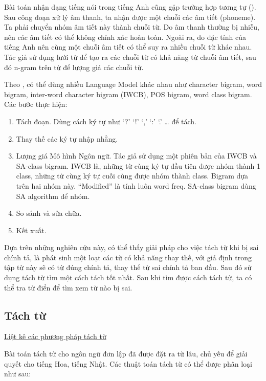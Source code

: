 \documentclass[a4paper,oneside]{book} %
\newcommand{\note}[1]{\underline{#1}}
\begin{document}
Bài toán nhận dạng tiếng nói trong tiếng Anh cũng gặp trường hợp tương tự
(\cite{Ravishankar}). Sau công đoạn xử lý âm thanh, ta nhận được
một chuỗi các âm tiết (phoneme). Ta phải chuyển nhóm âm tiết này thành
chuỗi từ. Do âm thanh thường bị nhiễu, nên các âm tiết có thể
không chính xác hoàn toàn. Ngoài ra, do đặc tính của tiếng Anh nên
cùng một chuỗi âm tiết có thể suy ra nhiều chuỗi từ khác nhau. Tác giả
sử dụng lưới từ để tạo ra các chuỗi từ có khả năng từ chuỗi âm tiết,
sau đó n-gram trên từ để lượng giá các chuỗi từ.

Theo \cite{Chang}, có thể dùng nhiều Language Model khác nhau như
character bigram, word bigram, inter-word character bigram (IWCB), POS
bigram, word class bigram. Các bước thực hiện:
\begin{enumerate}
\item Tách đoạn. Dùng cách ký tự như `?' `!' `,'
  `:' `.' \ldots{} để tách.
\item Thay thế các ký tự nhập nhằng. 
\item Lượng giá Mô hình Ngôn ngữ. Tác giả sử dụng một phiên bản của
  IWCB và SA-class bigram. IWCB là, những từ cùng ký tự đầu tiên được
  nhóm thành 1 class, những từ cùng ký tự cuối cùng được nhóm thành
  class. Bigram dựa trên hai nhóm này. ``Modified'' là tính luôn word
  freq. SA-class bigram dùng SA algorithm để nhóm.
\item So sánh và sửa chữa.
\item Kết xuất.
\end{enumerate}

Dựa trên những nghiên cứu này, có thể thấy giải pháp cho việc tách từ khi bị
sai chính tả, là phát sinh một loạt các từ có khả năng thay thế, với
giả định trong tập từ này sẽ có từ đúng chính tả, thay thế từ sai chính
tả ban đầu. Sau đó sử dụng tách từ tìm một cách tách tốt nhất. Sau khi
tìm được cách tách từ, ta có thể tra từ điển để tìm xem từ nào bị sai.


\subsection{Tách từ}

\note{Liệt kê các phương pháp tách từ}

Bài toán tách từ cho ngôn ngữ đơn lập đã được đặt ra từ lâu, chủ yếu
để giải quyết cho tiếng Hoa, tiếng Nhật. Các thuật toán tách từ có thể
được phân loại như sau:
\end{document}
